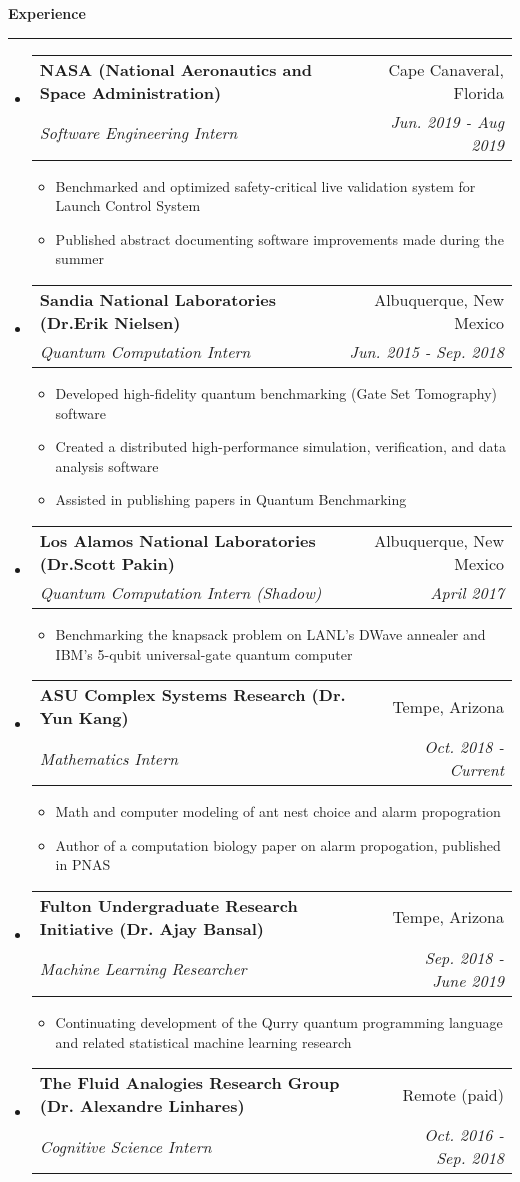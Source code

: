 \documentclass[letterpaper,11pt]{article}
\makeatletter
\newcommand{\sectionline}{
    \noindent\rule[0.5ex]{\linewidth}{0.5pt}
}
\newcommand{\resitem}[1]{\item #1 \vspace{-3pt}}
\newcommand{\resheading}[1]{
    {\large \textbf{#1}}
    \sectionline
}
\newcommand{\colfill}{@{\extracolsep{\fill}}}
\newcommand{\ressubheading}[4]{
\begin{tabular*}{6.5in}{l\colfill r}
		\textbf{#1} & #2 \\
		\textit{#3} & \textit{#4} \\
\end{tabular*}\vspace{-6pt}}
\makeatother
\begin{document}
\resheading{Experience}
\begin{itemize}
 \item
     \ressubheading{NASA (National Aeronautics and Space Administration)}{Cape Canaveral, Florida}{Software Engineering Intern}{Jun. 2019 - Aug 2019}
 	\begin{itemize}
        \resitem{Benchmarked and optimized safety-critical live validation system for Launch Control System}
 		\resitem{Published abstract documenting software improvements made during the summer}
 	\end{itemize}
 \item
    \ressubheading{Sandia National Laboratories (Dr.Erik Nielsen)}{Albuquerque, New Mexico}{Quantum Computation Intern}{Jun. 2015 - Sep. 2018}
 	\begin{itemize}
        \resitem{Developed high-fidelity quantum benchmarking (Gate Set Tomography) software}
 		\resitem{Created a distributed high-performance simulation, verification, and data analysis software}
 		\resitem{Assisted in publishing papers in Quantum Benchmarking}
 	\end{itemize}
 \item
     \ressubheading{Los Alamos National Laboratories (Dr.Scott Pakin)}{Albuquerque, New Mexico}{Quantum Computation Intern (Shadow)}{April 2017}
 	\begin{itemize}
 		\resitem{Benchmarking the knapsack problem on LANL's DWave annealer and IBM's 5-qubit universal-gate quantum computer}
 	\end{itemize}
 \item
    \ressubheading{ASU Complex Systems Research (Dr. Yun Kang)}{Tempe, Arizona}{Mathematics Intern}{Oct. 2018 - Current}
 	\begin{itemize}
 		\resitem{Math and computer modeling of ant nest choice and alarm propogration}
        \resitem{Author of a computation biology paper on alarm propogation, published in PNAS}
 	\end{itemize}
 \item
     \ressubheading{Fulton Undergraduate Research Initiative (Dr. Ajay Bansal)}{Tempe, Arizona}{Machine Learning Researcher}{Sep. 2018 - June 2019}
 	\begin{itemize}
        \resitem{Continuating development of the Qurry quantum programming language and related statistical machine learning research}
 	\end{itemize}
 \item
    \ressubheading{The Fluid Analogies Research Group (Dr. Alexandre Linhares)}{Remote (paid)}{Cognitive Science Intern}{Oct. 2016 - Sep. 2018}

\end{itemize}
\end{document}
